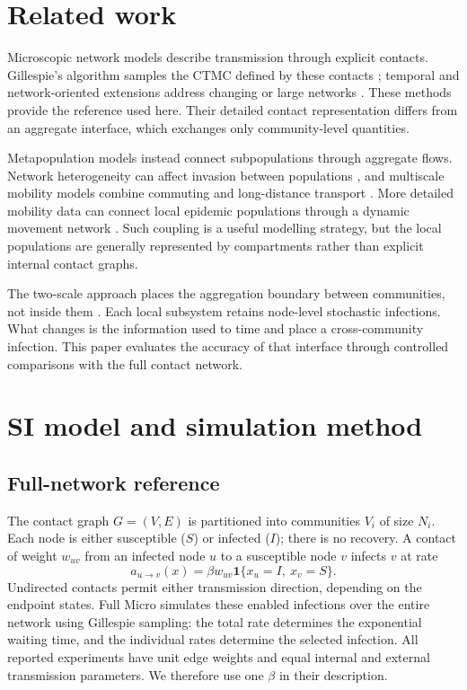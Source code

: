 \documentclass[a4paper,fleqn]{cas-sc}
\begin{document}
\section{Related work}
\label{sec:related_work}

Microscopic network models describe transmission through explicit contacts. Gillespie's algorithm samples the CTMC defined by these contacts \cite{gillespie1977exact}; temporal and network-oriented extensions address changing or large networks \cite{vestergaard2015,kuryliak2025simulating}. These methods provide the reference used here. Their detailed contact representation differs from an aggregate interface, which exchanges only community-level quantities.

Metapopulation models instead connect subpopulations through aggregate flows. Network heterogeneity can affect invasion between populations \cite{colizza2007reaction}, and multiscale mobility models combine commuting and long-distance transport \cite{balcan2009,balcan2010modeling}. More detailed mobility data can connect local epidemic populations through a dynamic movement network \cite{chang2021}. Such coupling is a useful modelling strategy, but the local populations are generally represented by compartments rather than explicit internal contact graphs.

The two-scale approach places the aggregation boundary between communities, not inside them \cite{kuryliak2025towards}. Each local subsystem retains node-level stochastic infections. What changes is the information used to time and place a cross-community infection. This paper evaluates the accuracy of that interface through controlled comparisons with the full contact network.

\section{SI model and simulation method}
\label{sec:model_architecture}

\subsection{Full-network reference}
\label{sec:full_network_ctmc_reference}

The contact graph $G=(V,E)$ is partitioned into communities $V_i$ of size $N_i$. Each node is either susceptible ($S$) or infected ($I$); there is no recovery. A contact of weight $w_{uv}$ from an infected node $u$ to a susceptible node $v$ infects $v$ at rate
\[
a_{u\to v}(x)=\beta w_{uv}\mathbf{1}\{x_u=I,\ x_v=S\}.
\]
Undirected contacts permit either transmission direction, depending on the endpoint states. Full Micro simulates these enabled infections over the entire network using Gillespie sampling: the total rate determines the exponential waiting time, and the individual rates determine the selected infection. All reported experiments have unit edge weights and equal internal and external transmission parameters. We therefore use one $\beta$ in their description.
\end{document}
